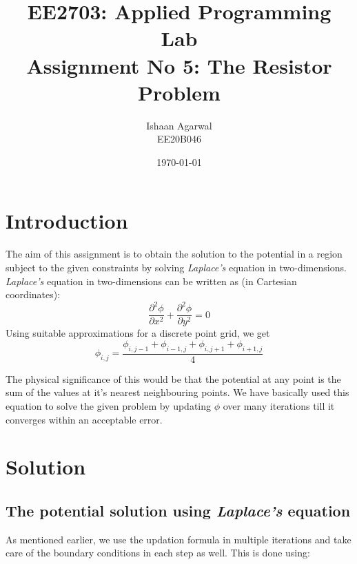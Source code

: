 \documentclass[11pt, a4paper]{article}
\title{EE2703: Applied Programming Lab \\ Assignment No 5: The Resistor Problem} %
\author{Ishaan Agarwal \\ EE20B046} %
\date{\today} %
\begin{document}
		
		
\maketitle %

\section{Introduction}
The aim of this assignment is to obtain the solution to the potential in a region subject to the given constraints by solving \textit{Laplace's} equation in two-dimensions.\\
\textit{Laplace's} equation in two-dimensions can be written as (in Cartesian coordinates):
\[\frac{\partial^2 \phi}{\partial x^2} + \frac{\partial^2 \phi}{\partial y^2} = 0\] 
Using suitable approximations for a discrete point grid, we get 
\[\phi_{i,j} = \frac{\phi_{i, j-1} + \phi_{i-1, j} + \phi_{i, j+1} + \phi_{i+1, j}}{4}\]

The physical significance of this would be that the potential at any point is the sum of the values at it's nearest neighbouring points. We have basically used this equation to solve the given problem by updating $\phi$ over many iterations till it converges within an acceptable error. 


\section{Solution}
\subsection{The potential solution using \textit{Laplace's} equation}
As mentioned earlier, we use the updation formula in multiple iterations and take care of the boundary conditions in each step as well. This is done using:
\\
\end{document}

